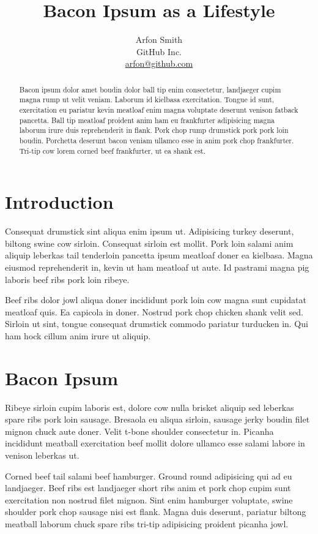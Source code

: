 \documentclass[a4paper,10pt]{article}
\title{Bacon Ipsum as a Lifestyle \vspace{-0.2cm}}
\author{
Arfon Smith\\
GitHub Inc.\\
\url{arfon@github.com}
}
\date{}
\begin{document}
\maketitle

\vspace{-1.2cm}
\begin{abstract}

\noindent
Bacon ipsum dolor amet boudin dolor ball tip enim consectetur, landjaeger cupim magna rump ut velit veniam. Laborum id kielbasa exercitation. Tongue id sunt, exercitation eu pariatur kevin meatloaf enim magna voluptate deserunt venison fatback pancetta. Ball tip meatloaf proident anim ham eu frankfurter adipisicing magna laborum irure duis reprehenderit in flank. Pork chop rump drumstick pork pork loin boudin. Porchetta deserunt bacon veniam ullamco esse in anim pork chop frankfurter. Tri-tip cow lorem corned beef frankfurter, ut ea shank est.
\end{abstract}

\section{Introduction}

Consequat drumstick sint aliqua enim ipsum ut. Adipisicing turkey deserunt, biltong swine cow sirloin. Consequat sirloin est mollit. Pork loin salami anim aliquip leberkas tail tenderloin pancetta ipsum meatloaf doner ea kielbasa. Magna eiusmod reprehenderit in, kevin ut ham meatloaf ut aute. Id pastrami magna pig laboris beef ribs pork loin ribeye.

Beef ribs dolor jowl aliqua doner incididunt pork loin cow magna sunt cupidatat meatloaf quis. Ea capicola in doner. Nostrud pork chop chicken shank velit sed. Sirloin ut sint, tongue consequat drumstick commodo pariatur turducken in. Qui ham hock cillum anim irure ut aliquip.

\section{Bacon Ipsum}

Ribeye sirloin cupim laboris est, dolore cow nulla brisket aliquip sed leberkas spare ribs pork loin sausage. Bresaola eu aliqua sirloin, sausage jerky boudin filet mignon chuck aute doner. Velit t-bone shoulder consectetur in. Picanha incididunt meatball exercitation beef mollit dolore ullamco esse salami labore in venison leberkas ut.

Corned beef tail salami beef hamburger. Ground round adipisicing qui ad eu landjaeger. Beef ribs est landjaeger short ribs anim et pork chop cupim sunt exercitation non nostrud filet mignon. Sint enim hamburger voluptate, swine shoulder pork chop sausage nisi est flank. Magna duis deserunt, pariatur biltong meatball laborum chuck spare ribs tri-tip adipisicing proident picanha jowl.
\end{document}
